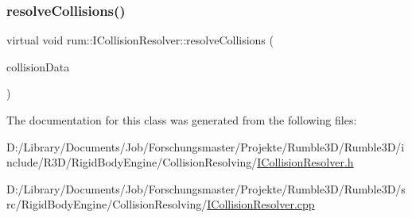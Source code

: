 \subsubsection{\texorpdfstring{resolve\+Collisions()}{resolveCollisions()}}
{\footnotesize\ttfamily virtual void rum\+::\+I\+Collision\+Resolver\+::resolve\+Collisions (\begin{DoxyParamCaption}\item[{const \mbox{\hyperlink{classrum_1_1_collision_data}{Collision\+Data}} \&}]{collision\+Data }\end{DoxyParamCaption})\hspace{0.3cm}{\ttfamily [pure virtual]}}



The documentation for this class was generated from the following files\+:\begin{DoxyCompactItemize}
\item 
D\+:/\+Library/\+Documents/\+Job/\+Forschungsmaster/\+Projekte/\+Rumble3\+D/\+Rumble3\+D/include/\+R3\+D/\+Rigid\+Body\+Engine/\+Collision\+Resolving/\mbox{\hyperlink{_i_collision_resolver_8h}{I\+Collision\+Resolver.\+h}}\item 
D\+:/\+Library/\+Documents/\+Job/\+Forschungsmaster/\+Projekte/\+Rumble3\+D/\+Rumble3\+D/src/\+Rigid\+Body\+Engine/\+Collision\+Resolving/\mbox{\hyperlink{_i_collision_resolver_8cpp}{I\+Collision\+Resolver.\+cpp}}\end{DoxyCompactItemize}
